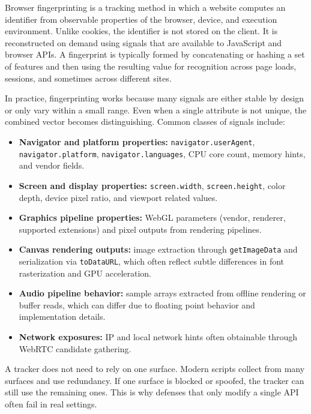 \documentclass[11pt]{report}
\begin{document}
Browser fingerprinting is a tracking method in which a website computes an identifier from observable properties of the browser, device, and execution environment. Unlike cookies, the identifier is not stored on the client. It is reconstructed on demand using signals that are available to JavaScript and browser APIs. A fingerprint is typically formed by concatenating or hashing a set of features and then using the resulting value for recognition across page loads, sessions, and sometimes across different sites.

In practice, fingerprinting works because many signals are either stable by design or only vary within a small range. Even when a single attribute is not unique, the combined vector becomes distinguishing. Common classes of signals include:

\begin{itemize}
    \item \textbf{Navigator and platform properties:} \texttt{navigator.userAgent}, \texttt{navigator.platform}, \newline \texttt{navigator.languages}, CPU core count, memory hints, and vendor fields.
    \item \textbf{Screen and display properties:} \texttt{screen.width}, \texttt{screen.height}, color depth, device pixel ratio, and viewport related values.
    \item \textbf{Graphics pipeline properties:} WebGL parameters (vendor, renderer, supported extensions) and pixel outputs from rendering pipelines.
    \item \textbf{Canvas rendering outputs:} image extraction through \texttt{getImageData} and serialization via \texttt{toDataURL}, which often reflect subtle differences in font rasterization and GPU acceleration.
    \item \textbf{Audio pipeline behavior:} sample arrays extracted from offline rendering or buffer reads, which can differ due to floating point behavior and implementation details.
    \item \textbf{Network exposures:} IP and local network hints often obtainable through WebRTC candidate gathering.
\end{itemize}

A tracker does not need to rely on one surface. Modern scripts collect from many surfaces and use redundancy. If one surface is blocked or spoofed, the tracker can still use the remaining ones. This is why defenses that only modify a single API often fail in real settings.
\end{document}
